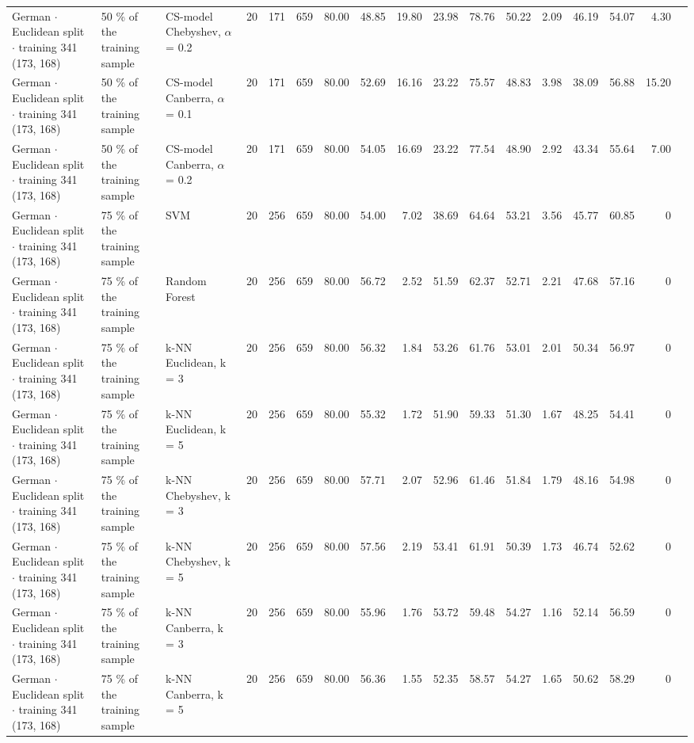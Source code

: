 \begin{longtable}{lllrrrrrrrrrrrrrl}
  German $\cdot$ Euclidean split $\cdot$ training 341 (173, 168) & 50 \% of the training sample & CS-model Chebyshev, $\alpha$ = 0.2 & 20 & 171 & 659 & 80.00 & 48.85 & 19.80 & 23.98 & 78.76 & 50.22 & 2.09 & 46.19 & 54.07 & 4.30 &  \\
  German $\cdot$ Euclidean split $\cdot$ training 341 (173, 168) & 50 \% of the training sample & CS-model Canberra, $\alpha$ = 0.1 & 20 & 171 & 659 & 80.00 & 52.69 & 16.16 & 23.22 & 75.57 & 48.83 & 3.98 & 38.09 & 56.88 & 15.20 &  \\
  German $\cdot$ Euclidean split $\cdot$ training 341 (173, 168) & 50 \% of the training sample & CS-model Canberra, $\alpha$ = 0.2 & 20 & 171 & 659 & 80.00 & 54.05 & 16.69 & 23.22 & 77.54 & 48.90 & 2.92 & 43.34 & 55.64 & 7.00 &  \\
  German $\cdot$ Euclidean split $\cdot$ training 341 (173, 168) & 75 \% of the training sample & SVM & 20 & 256 & 659 & 80.00 & 54.00 & 7.02 & 38.69 & 64.64 & 53.21 & 3.56 & 45.77 & 60.85 & 0 &  \\
  German $\cdot$ Euclidean split $\cdot$ training 341 (173, 168) & 75 \% of the training sample & Random Forest & 20 & 256 & 659 & 80.00 & 56.72 & 2.52 & 51.59 & 62.37 & 52.71 & 2.21 & 47.68 & 57.16 & 0 &  \\
  German $\cdot$ Euclidean split $\cdot$ training 341 (173, 168) & 75 \% of the training sample & k-NN Euclidean, k = 3 & 20 & 256 & 659 & 80.00 & 56.32 & 1.84 & 53.26 & 61.76 & 53.01 & 2.01 & 50.34 & 56.97 & 0 &  \\
  German $\cdot$ Euclidean split $\cdot$ training 341 (173, 168) & 75 \% of the training sample & k-NN Euclidean, k = 5 & 20 & 256 & 659 & 80.00 & 55.32 & 1.72 & 51.90 & 59.33 & 51.30 & 1.67 & 48.25 & 54.41 & 0 &  \\
  German $\cdot$ Euclidean split $\cdot$ training 341 (173, 168) & 75 \% of the training sample & k-NN Chebyshev, k = 3 & 20 & 256 & 659 & 80.00 & 57.71 & 2.07 & 52.96 & 61.46 & 51.84 & 1.79 & 48.16 & 54.98 & 0 &  \\
  German $\cdot$ Euclidean split $\cdot$ training 341 (173, 168) & 75 \% of the training sample & k-NN Chebyshev, k = 5 & 20 & 256 & 659 & 80.00 & 57.56 & 2.19 & 53.41 & 61.91 & 50.39 & 1.73 & 46.74 & 52.62 & 0 &  \\
  German $\cdot$ Euclidean split $\cdot$ training 341 (173, 168) & 75 \% of the training sample & k-NN Canberra, k = 3 & 20 & 256 & 659 & 80.00 & 55.96 & 1.76 & 53.72 & 59.48 & 54.27 & 1.16 & 52.14 & 56.59 & 0 &  \\
  German $\cdot$ Euclidean split $\cdot$ training 341 (173, 168) & 75 \% of the training sample & k-NN Canberra, k = 5 & 20 & 256 & 659 & 80.00 & 56.36 & 1.55 & 52.35 & 58.57 & 54.27 & 1.65 & 50.62 & 58.29 & 0 &  \\

\end{longtable}
